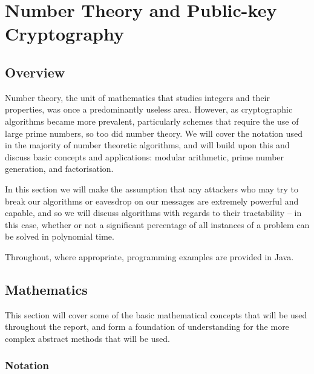 
\chapter{Number Theory and Public-key Cryptography}
\label{Chapter3}

\section{Overview}

Number theory, the unit of mathematics that studies integers and their properties, was once a predominantly useless area. However, as cryptographic algorithms became more prevalent, particularly schemes that require the use of large prime numbers, so too did number theory. We will cover the notation used in the majority of number theoretic algorithms, and will build upon this and discuss basic concepts and applications: modular arithmetic, prime number generation, and factorisation.

In this section we will make the assumption that any attackers who may try to break our algorithms or eavesdrop on our messages are extremely powerful and capable, and so we will discuss algorithms with regards to their tractability -- in this case, whether or not a significant percentage of all instances of a problem can be solved in polynomial time.

Throughout, where appropriate, programming examples are provided in Java.

\section{Mathematics}

This section will cover some of the basic mathematical concepts that will be used throughout the report, and form a foundation of understanding for the more complex abstract methods that will be used.

\subsection{Notation}

